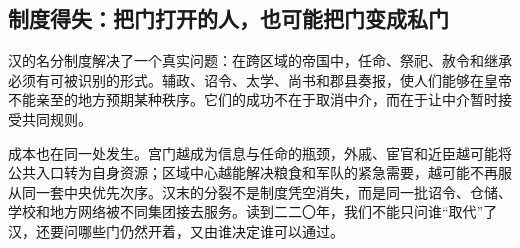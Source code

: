 \subsection{制度得失：把门打开的人，也可能把门变成私门}

汉的名分制度解决了一个真实问题：在跨区域的帝国中，任命、祭祀、赦令和继承必须有可被识别的形式。辅政、诏令、太学、尚书和郡县奏报，使人们能够在皇帝不能亲至的地方预期某种秩序。它们的成功不在于取消中介，而在于让中介暂时接受共同规则。

成本也在同一处发生。宫门越成为信息与任命的瓶颈，外戚、宦官和近臣越可能将公共入口转为自身资源；区域中心越能解决粮食和军队的紧急需要，越可能不再服从同一套中央优先次序。汉末的分裂不是制度凭空消失，而是同一批诏令、仓储、学校和地方网络被不同集团接去服务。读到二二〇年，我们不能只问谁“取代”了汉，还要问哪些门仍然开着，又由谁决定谁可以通过。
